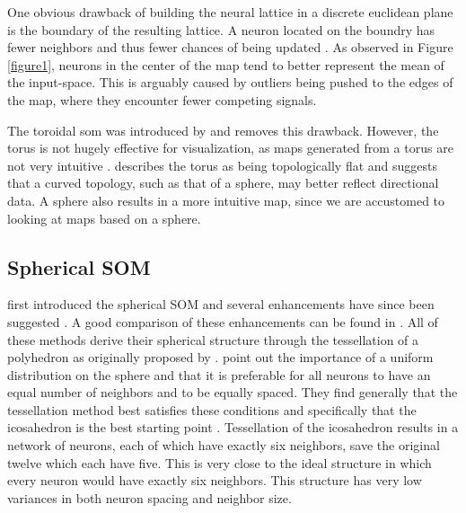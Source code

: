 \documentclass[11pt]{article}
\begin{document}
One obvious drawback of building the neural lattice in a discrete euclidean
plane is the boundary of the resulting lattice.  A neuron located on the boundry
has fewer neighbors and thus fewer chances of being updated \citep{wu2006}.  As
observed in Figure \ref{figure1}, neurons in the center of the map tend to
better represent the mean of the input-space.  This is arguably caused by
outliers being pushed to the edges of the map, where they encounter fewer
competing signals.

The toroidal som was introduced by \cite{li1993} and removes this drawback.
However, the torus is not hugely effective for visualization, as maps generated
from a torus are not very intuitive \citep{ito2000,wu2006}.  \cite{ritter99}
describes the torus as being topologically flat and suggests that a curved
topology, such as that of a sphere, may better reflect directional data.  A
sphere also results in a more intuitive map, since we are accustomed to looking
at maps based on a sphere.

\subsection{Spherical SOM}
\cite{ritter99} first introduced the spherical SOM and several enhancements have
since been suggested \citep{boudjemai2003,sangole03,Nishio:2006fk,wu2006}.  A
good comparison of these enhancements can be found in \citep{wu2006}.  All of
these methods derive their spherical structure through the tessellation of a
polyhedron as originally proposed by \citeauthor{ritter99}.  \cite{wu2006} point
out the importance of a uniform distribution on the sphere and that it is
preferable for all neurons to have an equal number of neighbors and to be
equally spaced.  They find generally that the tessellation method best satisfies
these conditions and specifically that the icosahedron is the best starting
point \citep{wu2005}. Tessellation of the icosahedron results in a network of
neurons, each of which have exactly six neighbors, save the original twelve which
each have five.  This is very close to the ideal structure in which every neuron
would have exactly six neighbors.  This structure has very low variances in both
neuron spacing and neighbor size.  
\end{document}

